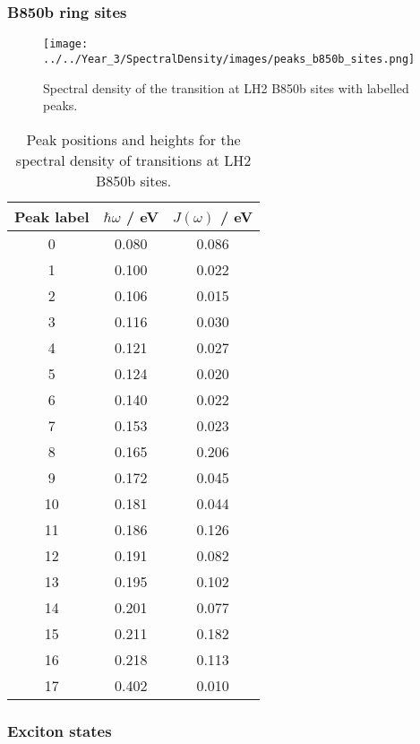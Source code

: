 \subsubsection{B850b ring sites}
\label{subsubsec:specdens_b850b}

\begin{figure}
    \centering
    \texttt{[image: ../../Year\_3/SpectralDensity/images/peaks\_b850b\_sites.png]}
    \caption{Spectral density of the \Qy transition at LH2 B850b sites with labelled
    peaks.}
    \label{fig:b850b_lablled_peaks}
\end{figure}

\begin{table}
    \centering
    \begin{tabular}{||c c c||}
    \hline
    Peak label & $\hbar \omega$ / eV & $J\left(\omega\right)$ / eV \\
    \hline\hline
    
     0 & 0.080 & 0.086 \\
     1 & 0.100 & 0.022 \\
     2 & 0.106 & 0.015 \\
     3 & 0.116 & 0.030 \\
     4 & 0.121 & 0.027 \\
     5 & 0.124 & 0.020 \\
     6 & 0.140 & 0.022 \\
     7 & 0.153 & 0.023 \\
     8 & 0.165 & 0.206 \\
     9 & 0.172 & 0.045 \\
     10 & 0.181 & 0.044 \\
     11 & 0.186 & 0.126 \\
     12 & 0.191 & 0.082 \\
     13 & 0.195 & 0.102 \\
     14 & 0.201 & 0.077 \\
     15 & 0.211 & 0.182 \\
     16 & 0.218 & 0.113 \\
     17 & 0.402 & 0.010 \\
    \hline 
    \end{tabular}
    \caption{Peak positions and heights for the spectral density of \Qy transitions
    at LH2 B850b sites.}
    \label{tab:b850b_lablled_peaks}
\end{table}

\afterpartskip
\subsubsection{Exciton states}
\label{subsubsec:specdens_eigval}

